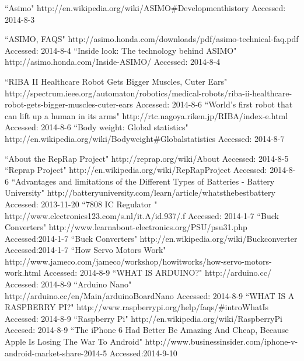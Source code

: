 \begin{thebibliography}{9}
``Asimo" http://en.wikipedia.org/wiki/ASIMO\#Development\textunderscore history Accessed: 2014-8-3

``ASIMO, FAQS" http://asimo.honda.com/downloads/pdf/asimo-technical-faq.pdf Accessed: 2014-8-4
``Inside look: The technology behind ASIMO" http://asimo.honda.com/Inside-ASIMO/ Accessed: 2014-8-4

``RIBA II Healthcare Robot Gets Bigger Muscles, Cuter Ears" http://spectrum.ieee.org/automaton/robotics/medical-robots/riba-ii-healthcare-robot-gets-bigger-muscles-cuter-ears Accessed: 2014-8-6
``World's first robot that can lift up a human in its arms" http://rtc.nagoya.riken.jp/RIBA/index-e.html Accessed: 2014-8-6
``Body weight: Global statistics" http://en.wikipedia.org/wiki/Body\textunderscore weight\#Global\textunderscore statistics Accessed: 2014-8-7

``About the RepRap Project" http://reprap.org/wiki/About Accessed: 2014-8-5
``Reprap Project" http://en.wikipedia.org/wiki/RepRap\textunderscore Project Accessed: 2014-8-6
``Advantages and limitations of the Different Types of Batteries - Battery University" http://batteryuniversity.com/learn/article/whats\textunderscore the\textunderscore best\textunderscore battery Accessed: 2013-11-20
``7808 IC Regulator " http://www.electronics123.com/s.nl/it.A/id.937/.f Accessed: 2014-1-7
``Buck Converters" http://www.learnabout-electronics.org/PSU/psu31.php Accessed:2014-1-7
``Buck Converters" http://en.wikipedia.org/wiki/Buck\textunderscore converter Accessed:2014-1-7
``How Servo Motors Work" http://www.jameco.com/jameco/workshop/howitworks/how-servo-motors-work.html Accessed: 2014-8-9
``WHAT IS ARDUINO?" http://arduino.cc/ Accessed: 2014-8-9
``Arduino Nano" http://arduino.cc/en/Main/arduinoBoardNano Accessed: 2014-8-9
``WHAT IS A RASPBERRY PI?" http://www.raspberrypi.org/help/faqs/\#introWhatIs Accessed: 2014-8-9
``Raspberry Pi" http://en.wikipedia.org/wiki/Raspberry\textunderscore Pi Accesed: 2014-8-9
``The iPhone 6 Had Better Be Amazing And Cheap, Because Apple Is Losing The War To Android" http://www.businessinsider.com/iphone-v-android-market-share-2014-5 Accessed:2014-9-10



\end{thebibliography}
